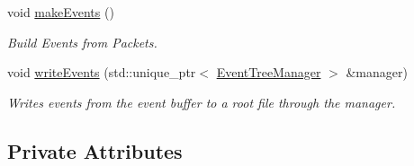\begin{DoxyCompactItemize}
void \hyperlink{class_processor_ae06672fc3ac6ef73525b64d4f9f769e7}{make\+Events} ()
\begin{DoxyCompactList}\small\item\em Build Events from Packets. \end{DoxyCompactList}\item 
void \hyperlink{class_processor_a1a19cb73f339992d6dd1be580c8efef0}{write\+Events} (std\+::unique\+\_\+ptr$<$ \hyperlink{class_event_tree_manager}{Event\+Tree\+Manager} $>$ \&manager)
\begin{DoxyCompactList}\small\item\em Writes events from the event buffer to a root file through the manager. \end{DoxyCompactList}\end{DoxyCompactItemize}
\subsection*{Private Attributes}
